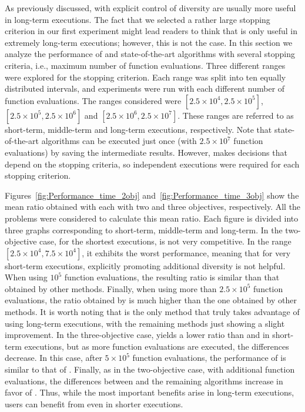 As previously discussed, \EAS{} with explicit control of diversity are usually more useful in long-term executions.
%
The fact that we selected a rather large stopping criterion in our first experiment might lead readers to think that \VSDMOEA{} is only
useful in extremely long-term executions;
%
however, this is not the case.
%
In this section we analyze the performance of \VSDMOEA{} and state-of-the-art algorithms with several stopping criteria, 
i.e., maximum number of function evaluations.
%
Three different ranges were explored for the stopping criterion.
%
Each range was split into ten equally distributed intervals, and experiments were run with each different number of function evaluations.
%
The ranges considered were $[2.5 \times 10^4, 2.5 \times 10^5]$, $[2.5 \times 10^5, 2.5 \times 10^6]$ and $[2.5 \times 10^6, 2.5 \times 10^7]$.
%
These ranges are referred to as short-term, middle-term and long-term executions, respectively.
%
Note that state-of-the-art algorithms can be executed just once (with $2.5 \times 10^7$ function evaluations) by saving the intermediate results.
%
However, \VSDMOEA{} makes decisions that depend on the stopping criteria, so independent executions were required for each stopping criterion.

Figures~\ref{fig:Performance_time_2obj} and~\ref{fig:Performance_time_3obj} show the mean \HV{} ratio obtained with each \MOEA{} 
with two and three objectives, respectively.
%
All the problems were considered to calculate this mean ratio.
%
Each figure is divided into three graphs corresponding to short-term, middle-term and long-term.
%
In the two-objective case, for the shortest executions, \VSDMOEA{} is not very competitive.
%
In the range $[2.5 \times 10^4, 7.5 \times 10^4]$, it exhibits the worst performance, meaning that for very short-term executions,
explicitly promoting additional diversity is not helpful.
%
When using $10^5$ function evaluations, the resulting \HV{} ratio is similar than that obtained by other methods.
%
Finally, when using more than $2.5 \times 10^5$ function evaluations, the \HV{} ratio obtained by \VSDMOEA{} is much higher than the one
obtained by other methods.
%
It is worth noting that \VSDMOEA{} is the only method that truly takes advantage of using long-term executions,
with the remaining methods just showing a slight improvement.
%
In the three-objective case, \VSDMOEA{} yields a lower \HV{} ratio than \RMOEA{} and \MOEAD{} in short-term executions,
but as more function evaluations are executed, the differences decrease.
%
In this case, after $5 \times 10^5$ function evaluations, the performance of \VSDMOEA{} is similar to that of \RMOEA{}.
%
Finally, as in the two-objective case, with additional function evaluations, the differences between \VSDMOEA{} and the remaining
algorithms increase in favor of \VSDMOEA{}.
%
Thus, while the most important benefits arise in long-term executions, users can benefit from \VSDMOEA{} even in shorter executions.

